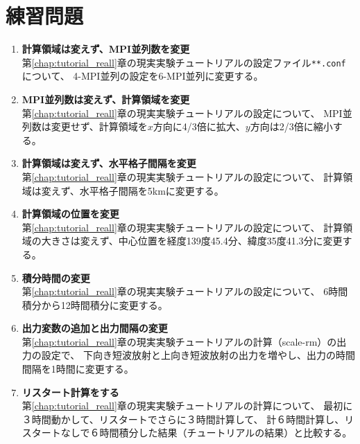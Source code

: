 \section*{練習問題}

\begin{enumerate}
\item {\bf 計算領域は変えず、MPI並列数を変更}\\
第\ref{chap:tutorial_reall}章の現実実験チュートリアルの設定ファイル\verb|**.conf|について、
4-MPI並列の設定を6-MPI並列に変更する。

\item {\bf MPI並列数は変えず、計算領域を変更}\\
第\ref{chap:tutorial_reall}章の現実実験チュートリアルの設定について、
MPI並列数は変更せず、計算領域を$x$方向に4/3倍に拡大、$y$方向は2/3倍に縮小する。

\item {\bf 計算領域は変えず、水平格子間隔を変更}\\
第\ref{chap:tutorial_reall}章の現実実験チュートリアルの設定について、
計算領域は変えず、水平格子間隔を5kmに変更する。

\item {\bf 計算領域の位置を変更}\\
第\ref{chap:tutorial_reall}章の現実実験チュートリアルの設定について、
計算領域の大きさは変えず、中心位置を経度139度45.4分、緯度35度41.3分に変更する。

\item {\bf 積分時間の変更}\\
第\ref{chap:tutorial_reall}章の現実実験チュートリアルの設定について、
6時間積分から12時間積分に変更する。

\item {\bf 出力変数の追加と出力間隔の変更}\\
第\ref{chap:tutorial_reall}章の現実実験チュートリアルの計算（scale-rm）の出力の設定で、
下向き短波放射と上向き短波放射の出力を増やし、出力の時間間隔を1時間に変更する。

\item {\bf リスタート計算をする}\\
第\ref{chap:tutorial_reall}章の現実実験チュートリアルの計算について、
最初に３時間動かして、リスタートでさらに３時間計算して、
計６時間計算し、リスタートなしで６時間積分した結果（チュートリアルの結果）と比較する。





\end{enumerate}

